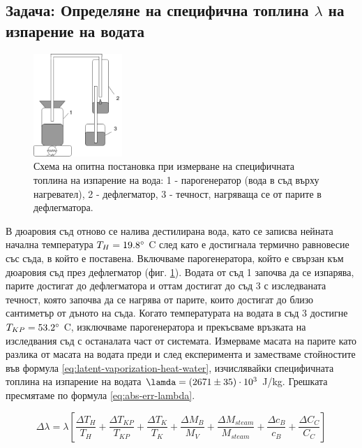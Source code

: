\documentclass[12pt]{article}
\begin{document}
\subsection{Задача: Определяне на специфична топлина $\lambda$ на изпарение на водата}
\begin{figure}
    \centering
    \includegraphics[width=0.3\textwidth]{images/setup-water-vaporization.png}
    \caption{\label{fig:setup-vaporization}Схема на опитна постановка при измерване на специфичната топлина на изпарение на вода: 1 - парогенератор (вода в съд върху нагревател), 2 - дефлегматор, 3 - течност, нагряваща се от парите в дефлегматора.}
\end{figure}

В дюаровия съд отново се налива дестилирана вода, като се записва нейната начална температура $T_H = 19.8 \degree $ C след като е достигнала термично равновесие със съда, в който е поставена. Включваме парогенератора, който е свързан към дюаровия съд през дефлегматор (фиг. \ref{fig:setup-vaporization}). Водата от съд 1 започва да се изпарява, парите достигат до дефлегматора и оттам достигат до съд 3 с изследваната течност, която започва да се нагрява от парите, които достигат до близо сантиметър от дъното на съда. Когато температурата на водата в съд 3 достигне $T_{KP} = 53.2 \degree$ C, изключваме парогенератора и прекъсваме връзката на изследвания съд с останалата част от системата. Измерваме масата на парите като разлика от масата на водата преди и след експеримента и заместваме стойностите във формула \ref{eq:latent-vaporization-heat-water}, изчислявайки специфичната топлина на изпарение на водата $\lamda = (2671 \pm 35) \cdot 10^3$ J/kg. Грешката пресмятаме по формула \ref{eq:abs-err-lambda}.

\begin{equation}\label{eq:abs-err-lambda}
    \Delta \lambda = \lambda\left[\frac{\Delta T_H}{T_H} + \frac{\Delta T_{KP}}{T_{KP}} + \frac{\Delta T_K}{T_K} + \frac{\Delta M_B}{M_V} + \frac{\Delta M_{steam}}{M_{steam}} + \frac{\Delta c_{B}}{c_{B}} + \frac{\Delta C_C}{C_C}\right]
\end{equation}
\end{document}
